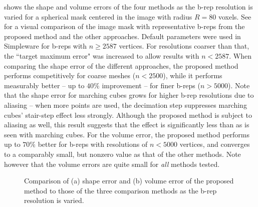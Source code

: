  shows the shape and volume errors of the four methods as the b-rep resolution is varied for a spherical mask centered in the image with radius $R = 80$ voxels. See  for a visual comparison of the image mask with representative b-reps from the proposed method and the other approaches. Default parameters were used in Simpleware for b-reps with $n \ge 2587$ vertices. For resolutions coarser than that, the ``target maximum error" was increased to allow results with $n < 2587$. When comparing the shape error of the different approaches, the proposed method performs competitively for coarse meshes ($n < 2500$), while it performs measurably better -- up to $40\%$ improvement -- for finer b-reps ($n > 5000$). Note that the shape error for marching cubes grows for higher b-rep resolutions due to aliasing -- when more points are used, the decimation step suppresses marching cubes' stair-step effect less strongly. Although the proposed method is subject to aliasing as well, this result suggests that the effect is significantly less than as is seen with marching cubes.  For the volume error, the proposed method performs up to $70\%$ better for b-reps with resolutions of $n < 5000$ vertices, and converges to a comparably small, but nonzero value as that of the other methods.  Note however that the volume errors are quite small for {\em all} methods tested.
\begin{figure}[b!]
\centering
{}
%	
\caption{Comparison of (a) shape error and (b) volume error of the proposed method to those of the three comparison methods as the b-rep resolution is varied.}
\label{fig:graph1}
\end{figure}
